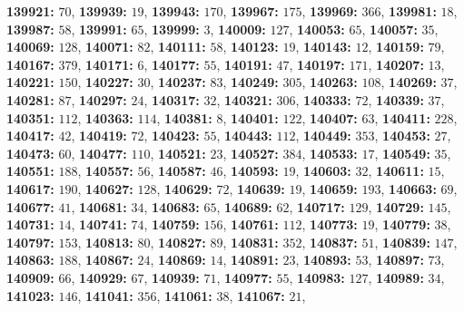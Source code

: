 \textsf{\bfseries 139921:} $70$, \textsf{\bfseries 139939:} $19$, \textsf{\bfseries 139943:} $170$, \textsf{\bfseries 139967:} $175$, \textsf{\bfseries 139969:} $366$, \textsf{\bfseries 139981:} $18$, \textsf{\bfseries 139987:} $58$, \textsf{\bfseries 139991:} $65$, \textsf{\bfseries 139999:} $3$, \textsf{\bfseries 140009:} $127$, \textsf{\bfseries 140053:} $65$, \textsf{\bfseries 140057:} $35$, \textsf{\bfseries 140069:} $128$, \textsf{\bfseries 140071:} $82$, \textsf{\bfseries 140111:} $58$, \textsf{\bfseries 140123:} $19$, \textsf{\bfseries 140143:} $12$, \textsf{\bfseries 140159:} $79$, \textsf{\bfseries 140167:} $379$, \textsf{\bfseries 140171:} $6$, \textsf{\bfseries 140177:} $55$, \textsf{\bfseries 140191:} $47$, \textsf{\bfseries 140197:} $171$, \textsf{\bfseries 140207:} $13$, \textsf{\bfseries 140221:} $150$, \textsf{\bfseries 140227:} $30$, \textsf{\bfseries 140237:} $83$, \textsf{\bfseries 140249:} $305$, \textsf{\bfseries 140263:} $108$, \textsf{\bfseries 140269:} $37$, \textsf{\bfseries 140281:} $87$, \textsf{\bfseries 140297:} $24$, \textsf{\bfseries 140317:} $32$, \textsf{\bfseries 140321:} $306$, \textsf{\bfseries 140333:} $72$, \textsf{\bfseries 140339:} $37$, \textsf{\bfseries 140351:} $112$, \textsf{\bfseries 140363:} $114$, \textsf{\bfseries 140381:} $8$, \textsf{\bfseries 140401:} $122$, \textsf{\bfseries 140407:} $63$, \textsf{\bfseries 140411:} $228$, \textsf{\bfseries 140417:} $42$, \textsf{\bfseries 140419:} $72$, \textsf{\bfseries 140423:} $55$, \textsf{\bfseries 140443:} $112$, \textsf{\bfseries 140449:} $353$, \textsf{\bfseries 140453:} $27$, \textsf{\bfseries 140473:} $60$, \textsf{\bfseries 140477:} $110$, \textsf{\bfseries 140521:} $23$, \textsf{\bfseries 140527:} $384$, \textsf{\bfseries 140533:} $17$, \textsf{\bfseries 140549:} $35$, \textsf{\bfseries 140551:} $188$, \textsf{\bfseries 140557:} $56$, \textsf{\bfseries 140587:} $46$, \textsf{\bfseries 140593:} $19$, \textsf{\bfseries 140603:} $32$, \textsf{\bfseries 140611:} $15$, \textsf{\bfseries 140617:} $190$, \textsf{\bfseries 140627:} $128$, \textsf{\bfseries 140629:} $72$, \textsf{\bfseries 140639:} $19$, \textsf{\bfseries 140659:} $193$, \textsf{\bfseries 140663:} $69$, \textsf{\bfseries 140677:} $41$, \textsf{\bfseries 140681:} $34$, \textsf{\bfseries 140683:} $65$, \textsf{\bfseries 140689:} $62$, \textsf{\bfseries 140717:} $129$, \textsf{\bfseries 140729:} $145$, \textsf{\bfseries 140731:} $14$, \textsf{\bfseries 140741:} $74$, \textsf{\bfseries 140759:} $156$, \textsf{\bfseries 140761:} $112$, \textsf{\bfseries 140773:} $19$, \textsf{\bfseries 140779:} $38$, \textsf{\bfseries 140797:} $153$, \textsf{\bfseries 140813:} $80$, \textsf{\bfseries 140827:} $89$, \textsf{\bfseries 140831:} $352$, \textsf{\bfseries 140837:} $51$, \textsf{\bfseries 140839:} $147$, \textsf{\bfseries 140863:} $188$, \textsf{\bfseries 140867:} $24$, \textsf{\bfseries 140869:} $14$, \textsf{\bfseries 140891:} $23$, \textsf{\bfseries 140893:} $53$, \textsf{\bfseries 140897:} $73$, \textsf{\bfseries 140909:} $66$, \textsf{\bfseries 140929:} $67$, \textsf{\bfseries 140939:} $71$, \textsf{\bfseries 140977:} $55$, \textsf{\bfseries 140983:} $127$, \textsf{\bfseries 140989:} $34$, \textsf{\bfseries 141023:} $146$, \textsf{\bfseries 141041:} $356$, \textsf{\bfseries 141061:} $38$, \textsf{\bfseries 141067:} $21$, 
